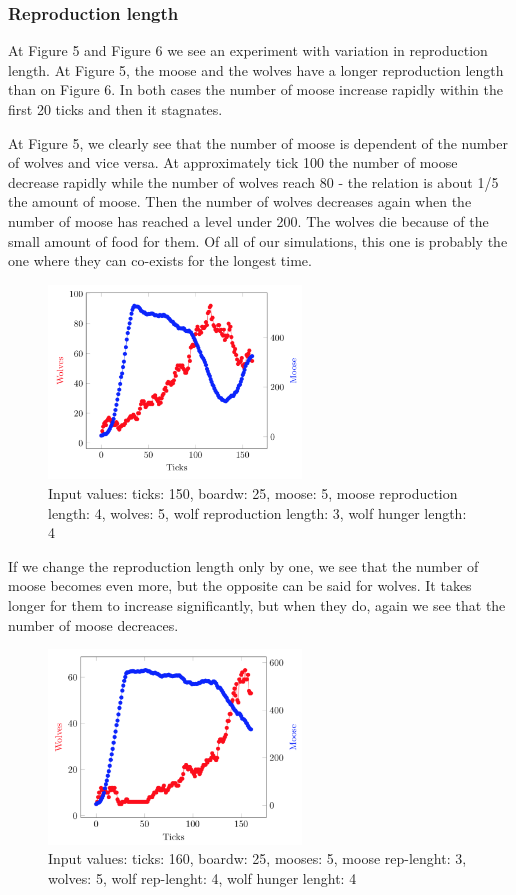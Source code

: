 \documentclass[a4paper]{report}
\begin{document}
\subsubsection*{Reproduction length}
At Figure 5 and Figure 6 we see an experiment with variation in reproduction length. At Figure 5, the moose and the wolves have a longer reproduction length than on Figure 6. In both cases the number of moose increase rapidly within the first 20 ticks and then it stagnates.
 
At Figure 5, we clearly see that the number of moose is dependent of the number of wolves and vice versa. At approximately tick 100 the number of moose decrease rapidly while the number of wolves reach 80 - the relation is about 1/5 the amount of moose. Then the number of wolves decreases again when the number of moose has reached a level under 200. The wolves die because of the small amount of food for them. \newline 
Of all of our simulations, this one is probably the one where they can co-exists for the longest time.

\begin{figure}[H]
\centering
\includegraphics[width=0.60\textwidth]{Experiments/sim_rep_c1}
\caption{Input values: ticks: 150, boardw: 25, moose: 5, moose reproduction length: 4, wolves: 5, wolf reproduction length: 3, wolf hunger length: 4}
\end{figure}

If we change the reproduction length only by one, we see that the number of moose becomes even more, but the opposite can be said for wolves. It takes longer for them to increase significantly, but when they do, again we see that the number of moose decreaces. 


\begin{figure}[H]
\centering
\includegraphics[width=0.60\textwidth]{Experiments/sim_rep_c2}
\caption{Input values: ticks: 160, boardw: 25, mooses: 5, moose rep-lenght: 3, wolves: 5, wolf rep-lenght: 4, wolf hunger lenght: 4}
\end{figure}
\end{document}
